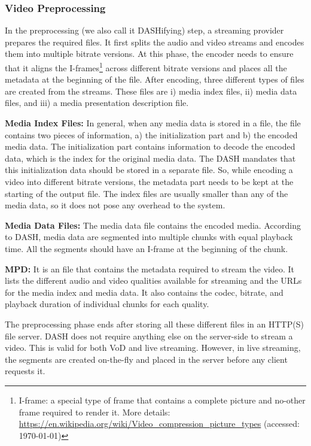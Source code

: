 \subsubsection{Video Preprocessing}
In the preprocessing (we also call it DASHifying) step, a streaming provider prepares the required files. It first splits the audio and video streams and encodes them into multiple bitrate versions. At this phase, the encoder needs to ensure that it aligns the I-frames\footnote{I-frame: a special type of frame that contains a complete picture and no-other frame required to render it. More details: \url{https://en.wikipedia.org/wiki/Video_compression_picture_types} (accessed: \today)} across different bitrate versions and places all the metadata at the beginning of the file. After encoding, three different types of files are created from the streams. These files are i) media index files, ii) media data files, and iii) a media presentation description file.

{\bf Media Index Files:} In general, when any media data is stored in a file, the file contains two pieces of information, a) the initialization part and b) the encoded media data. The initialization part contains information to decode the encoded data, which is the index for the original media data. The \ac{DASH} mandates that this initialization data should be stored in a separate file. So, while encoding a video into different bitrate versions, the metadata part needs to be kept at the starting of the output file. The index files are usually smaller than any of the media data, so it does not pose any overhead to the system.

{\bf Media Data Files:} The media data file contains the encoded media. According to \ac{DASH}, media data are segmented into multiple chunks with equal playback time. All the segments should have an I-frame at the beginning of the chunk.

{\bf \ac{MPD}:} It is an {\tt {}} file that contains the metadata required to stream the video. It lists the different audio and video qualities available for streaming and the \acsp{URL} for the media index and media data. It also contains the codec, bitrate, and playback duration of individual chunks for each quality.

The preprocessing phase ends after storing all these different files in an \ac{HTTP(S)} file server. DASH does not require anything else on the server-side to stream a video. This is valid for both \ac{VoD} and live streaming. However, in live streaming, the segments are created on-the-fly and placed in the server before any client requests it.

